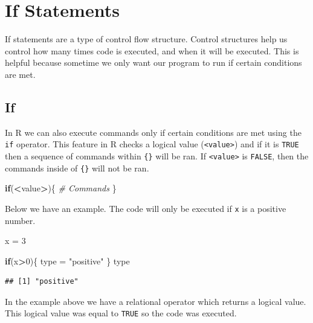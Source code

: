 \documentclass[
]{book}
\newenvironment{Shaded}{\begin{snugshade}}{\end{snugshade}}
\newcommand{\CommentTok}[1]{\textcolor[rgb]{0.56,0.35,0.01}{\textit{#1}}}
\newcommand{\ControlFlowTok}[1]{\textcolor[rgb]{0.13,0.29,0.53}{\textbf{#1}}}
\newcommand{\DecValTok}[1]{\textcolor[rgb]{0.00,0.00,0.81}{#1}}
\newcommand{\NormalTok}[1]{#1}
\newcommand{\OperatorTok}[1]{\textcolor[rgb]{0.81,0.36,0.00}{\textbf{#1}}}
\newcommand{\StringTok}[1]{\textcolor[rgb]{0.31,0.60,0.02}{#1}}
\begin{document}
\hypertarget{if-statements}{%
\chapter{If Statements}\label{if-statements}}

If statements are a type of control flow structure. Control structures help us control how many times code is executed, and when it will be executed. This is helpful because sometime we only want our program to run if certain conditions are met.

\hypertarget{if}{%
\section{If}\label{if}}

In R we can also execute commands only if certain conditions are met using the \texttt{if} operator. This feature in R checks a logical value (\texttt{\textless{}value\textgreater{}}) and if it is \texttt{TRUE} then a sequence of commands within \texttt{\{\}} will be ran. If \texttt{\textless{}value\textgreater{}} is \texttt{FALSE}, then the commands inside of \texttt{\{\}} will not be ran.

\begin{Shaded}
\begin{Highlighting}[]
\ControlFlowTok{if}\NormalTok{(}\OperatorTok{<}\NormalTok{value}\OperatorTok{>}\NormalTok{)\{}
  \CommentTok{# Commands }
\NormalTok{\}}
\end{Highlighting}
\end{Shaded}

Below we have an example. The code will only be executed if \texttt{x} is a positive number.

\begin{Shaded}
\begin{Highlighting}[]
\NormalTok{x =}\StringTok{ }\DecValTok{3}

\ControlFlowTok{if}\NormalTok{(x}\OperatorTok{>}\DecValTok{0}\NormalTok{)\{}
\NormalTok{  type =}\StringTok{ "positive"}
\NormalTok{\}}
\NormalTok{type }
\end{Highlighting}
\end{Shaded}

\begin{verbatim}
## [1] "positive"
\end{verbatim}

In the example above we have a relational operator which returns a logical value. This logical value was equal to \texttt{TRUE} so the code was executed.
\end{document}

